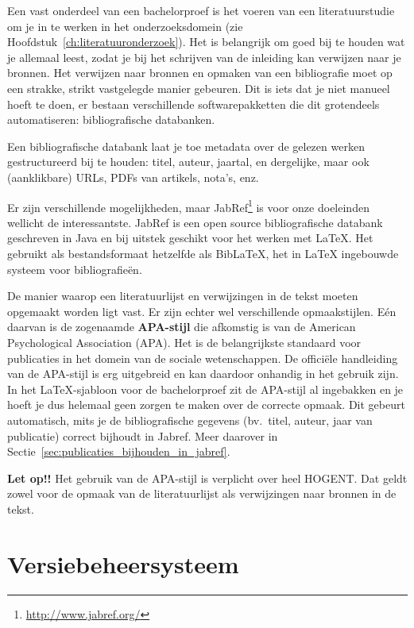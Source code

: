 Een vast onderdeel van een bachelorproef is het voeren van een literatuurstudie om je in te werken in het onderzoeksdomein (zie Hoofdstuk~\ref{ch:literatuuronderzoek}). Het is belangrijk om goed bij te houden wat je allemaal leest, zodat je bij het schrijven van de inleiding kan verwijzen naar je bronnen. Het verwijzen naar bronnen en opmaken van een bibliografie moet op een strakke, strikt vastgelegde manier gebeuren. Dit is iets dat je niet manueel hoeft te doen, er bestaan verschillende softwarepakketten die dit grotendeels automatiseren: bibliografische databanken.

Een bibliografische databank laat je toe metadata over de gelezen werken gestructureerd bij te houden: titel, auteur, jaartal, en dergelijke, maar ook (aanklikbare) URLs, PDFs van artikels, nota's, enz.

Er zijn verschillende mogelijkheden, maar JabRef\footnote{\url{http://www.jabref.org/}} is voor onze doeleinden wellicht de interessantste. JabRef is een open source bibliografische databank geschreven in Java en bij uitstek geschikt voor het werken met {\LaTeX}. Het gebruikt als bestandsformaat hetzelfde als Bib{\LaTeX}, het in {\LaTeX} ingebouwde systeem voor bibliografieën.

De manier waarop een literatuurlijst en verwijzingen in de tekst moeten opgemaakt worden ligt vast. Er zijn echter wel verschillende opmaakstijlen. Eén daarvan is de zogenaamde \textbf{APA-stijl} die afkomstig is van de American Psychological Association (APA). Het is de belangrijkste standaard voor publicaties in het domein van de sociale wetenschappen. De officiële handleiding van de APA-stijl is erg uitgebreid en kan daardoor onhandig in het gebruik zijn. In het {\LaTeX}-sjabloon voor de bachelorproef zit de APA-stijl al ingebakken en je hoeft je dus helemaal geen zorgen te maken over de correcte opmaak. Dit gebeurt automatisch, mits je de bibliografische gegevens (bv.\ titel, auteur, jaar van publicatie) correct bijhoudt in Jabref. Meer daarover in Sectie~\ref{sec:publicaties_bijhouden_in_jabref}.

\textbf{Let op!!} Het gebruik van de APA-stijl is verplicht over heel HOGENT. Dat geldt zowel voor de opmaak van de literatuurlijst als verwijzingen naar bronnen in de tekst.

\section{Versiebeheersysteem}%
\label{sec:versiebeheersysteem}

